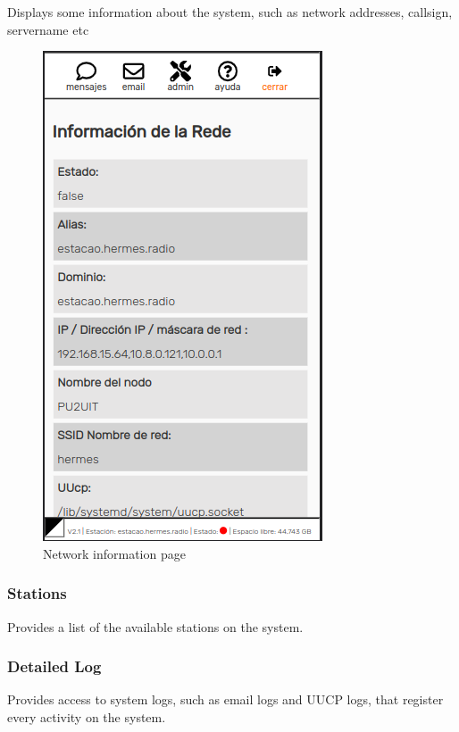 \documentclass[11pt,a4paper]{article}
\begin{document}
Displays some information about the system, such as network addresses, callsign, servername etc
     \begin{figure}[H]
     \vspace{-10pt}
    \centering
    \includegraphics[width=0.5\columnwidth]{screenshots/frontend/es/networkinfo.png}
    \caption{Network information page}
    \label{fig:netinfo}
  
    \end{figure}

\subsubsection{Stations} 

Provides a list of the available stations on the system.
    
\subsubsection{Detailed Log}
Provides access to system logs, such as email logs and UUCP logs, that register every activity on the system.
    
\end{document}
